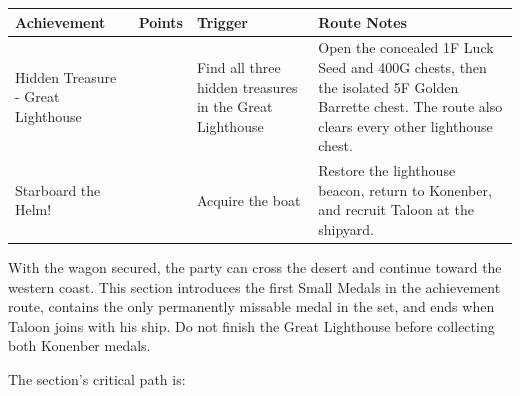\documentclass[
  american,
  10pt,
  letterpaper,
  oneside,
  open=any]{scrreprt}
\newcounter{none} %
\newenvironment{guidetable}{%
  \small\setstretch{1.0}%
  \setlength{\tabcolsep}{4pt}%
  \setlength{\LTpre}{8pt}\setlength{\LTpost}{10pt}%
  \renewcommand{\arraystretch}{1.16}%
}{ }
\begin{document}
\begin{guidetable}

{\def\LTcaptype{none} %
\begin{longtable}[]{@{}
  >{\raggedright\arraybackslash}p{}
  >{\raggedleft\arraybackslash}p{}
  >{\raggedright\arraybackslash}p{}
  >{\raggedright\arraybackslash}p{}@{}}
\toprule\noalign{}
\begin{minipage}[b]{\linewidth}\raggedright
\color{GuideGreen}\bfseries Achievement
\end{minipage} & \begin{minipage}[b]{\linewidth}\raggedleft
\color{GuideGreen}\bfseries Points
\end{minipage} & \begin{minipage}[b]{\linewidth}\raggedright
\color{GuideGreen}\bfseries Trigger
\end{minipage} & \begin{minipage}[b]{\linewidth}\raggedright
\color{GuideGreen}\bfseries Route Notes
\end{minipage} \\
\midrule\noalign{}
\endhead
\bottomrule\noalign{}
\endlastfoot
Hidden Treasure - Great Lighthouse & 5 & Find all three hidden treasures
in the Great Lighthouse & Open the concealed 1F Luck Seed and 400G
chests, then the isolated 5F Golden Barrette chest. The route also
clears every other lighthouse chest. \\
Starboard the Helm! & 10 & Acquire the boat & Restore the lighthouse
beacon, return to Konenber, and recruit Taloon at the shipyard. \\
\end{longtable}
}

\end{guidetable}

With the wagon secured, the party can cross the desert and continue
toward the western coast. This section introduces the first Small Medals
in the achievement route, contains the only permanently missable medal
in the set, and ends when Taloon joins with his ship. Do not finish the
Great Lighthouse before collecting both Konenber medals.

The section's critical path is:
\end{document}
